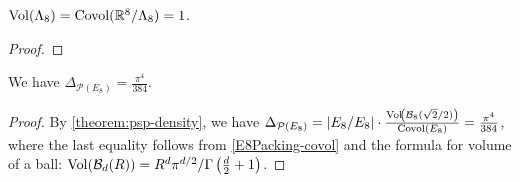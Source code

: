 \begin{lemma}\label{E8Packing-covol}\leanok
  $\operatorname{Vol}\!\left(\Lambda_8\right) = \mathrm{Covol}(\mathbb{R}^8 / \Lambda_8) = 1$.
\end{lemma}
\begin{proof}\leanok
\end{proof}

\begin{theorem}\label{E8Packing-density}\leanok
  We have $\Delta_{\mathcal{P}(E_8)} = \frac{\pi^4}{384}$.
\end{theorem}
\begin{proof}\leanok
  By \cref{theorem:psp-density}, we have $\Delta_{\mathcal{P}(E_8)} = |E_8 / E_8| \cdot \frac{\operatorname{Vol}\!\left(\mathcal{B}_8(\sqrt{2} / 2)\right)}{\mathrm{Covol}(E_8)} = \frac{\pi^4}{384}$, where the last equality follows from \cref{E8Packing-covol} and the formula for volume of a ball: $\operatorname{Vol}\!\left(\mathcal{B}_d(R)\right) = R^d \pi^{d / 2} / \Gamma\left(\frac{d}{2} + 1\right)$.
\end{proof}
